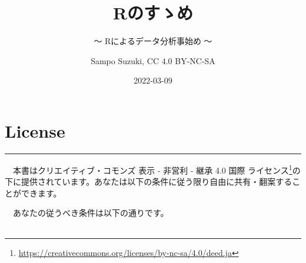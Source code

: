 \documentclass[
  12pt,
]{book}
\title{Rのすゝめ}
\subtitle{〜 Rによるデータ分析事始め 〜}
\author{Sampo Suzuki, CC 4.0 BY-NC-SA}
\date{2022-03-09}
\DeclareRobustCommand{\href}[2]{#2\footnote{\url{#1}}}
\begin{document}
\maketitle

\makeatletter
\def\emptypage@emptypage{
    \hbox{}
    \thispagestyle{headings}
    \newpage
}
\def\cleardoublepage{
        \clearpage
        \if@twoside
            \ifodd\c@page
            \else
                \emptypage@emptypage
            \fi
        \fi
    }
\makeatother

\makeatletter
\renewenvironment{thebibliography}[1]
{\chapter*{\bibname\@mkboth{\bibname}{\bibname}}
   \addcontentsline{toc}{chapter}{\bibname}%
   \list{\@biblabel{\@arabic\c@enumiv}}%
        {\settowidth\labelwidth{\@biblabel{#1}}%
         \leftmargin\labelwidth
         \advance\leftmargin\labelsep
         \@openbib@code
         \usecounter{enumiv}%
         \let\p@enumiv\@empty
         \renewcommand\theenumiv{\@arabic\c@enumiv}}%
   \sloppy
   \clubpenalty4000
   \@clubpenalty\clubpenalty
   \widowpenalty4000%
   \sfcode`\.\@m}
  {\def\@noitemerr
    {\@latex@warning{Empty `thebibliography' environment}}%
   \endlist}
\makeatother

{
\hypersetup{linkcolor=}
\setcounter{tocdepth}{3}
\tableofcontents
}
\listoffigures
\listoftables
{}
\hypertarget{license}{%
\chapter*{License}\label{license}}

\begin{center}\rule{0.5\linewidth}{0.5pt}\end{center}

　本書は\href{https://creativecommons.org/licenses/by-nc-sa/4.0/deed.ja}{クリエイティブ・コモンズ 表示 - 非営利 - 継承 4.0 国際 ライセンス}の下に提供されています。あなたは以下の条件に従う限り自由に共有・翻案することができます。

　あなたの従うべき条件は以下の通りです。\\
　
\end{document}
